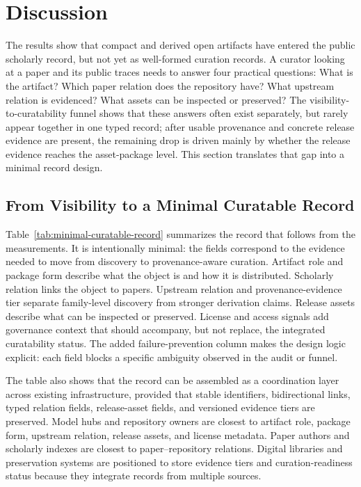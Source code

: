 \section{Discussion}
\label{sec:discussion}

The results show that compact and derived open \llm artifacts have entered the public scholarly record, but not yet as well-formed curation records. A curator looking at a paper and its public traces needs to answer four practical questions: What is the artifact? Which paper relation does the repository have? What upstream relation is evidenced? What assets can be inspected or preserved? The visibility-to-curatability funnel shows that these answers often exist separately, but rarely appear together in one typed record; after usable provenance and concrete release evidence are present, the remaining drop is driven mainly by whether the release evidence reaches the asset-package level. This section translates that gap into a minimal record design.

\subsection{From Visibility to a Minimal Curatable Record}



Table~\ref{tab:minimal-curatable-record} summarizes the record that follows from the measurements. It is intentionally minimal: the fields correspond to the evidence needed to move from discovery to provenance-aware curation. Artifact role and package form describe what the object is and how it is distributed. Scholarly relation links the object to papers. Upstream relation and provenance-evidence tier separate family-level discovery from stronger derivation claims. Release assets describe what can be inspected or preserved. License and access signals add governance context that should accompany, but not replace, the integrated curatability status. The added failure-prevention column makes the design logic explicit: each field blocks a specific ambiguity observed in the audit or funnel.

The table also shows that the record can be assembled as a coordination layer across existing infrastructure, provided that stable identifiers, bidirectional links, typed relation fields, release-asset fields, and versioned evidence tiers are preserved. Model hubs and repository owners are closest to artifact role, package form, upstream relation, release assets, and license metadata. Paper authors and scholarly indexes are closest to paper--repository relations. Digital libraries and preservation systems are positioned to store evidence tiers and curation-readiness status because they integrate records from multiple sources.

